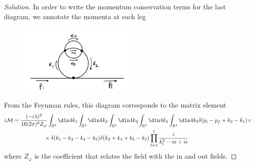 \begin{proof}[Solution]
   In order to write the momentum conservation terms for the last diagram, we annotate the momenta at each leg
   \begin{figure}[H]
      \centering
      \includegraphics[width=0.5\textwidth]{p2b.png}
   \end{figure}
   \noindent From the Feynman rules, this diagram corresponds to the matrix element
   \begin{align*}
      i \mathcal{M} &= \frac{(-i \lambda)^3}{16(2 \pi)^8 Z_\varphi} \int_{\mathbb{R}^4} \dln4{k_1} \int_{\mathbb{R}^4} \dln4{k_2} \int_{\mathbb{R}^4} \dln4{k_3} \int_{\mathbb{R}^4} \dln4{k_4} \int_{\mathbb{R}^4} \dln4{k_5} \delta(p_i - p_f + k_2 - k_1) \times \\
                    &{}\phantom{=\frac{(-i \lambda)^3}{(2 \pi)^8 S Z_\varphi}} \times \delta(k_1 - k_3 - k_4 - k_5) \delta(k_3 + k_4 + k_5 - k_2) \prod_{\ell = 1}^5 \frac{i}{k_i^2 - m + i \epsilon}
   \end{align*}
   where \(Z_\varphi\) is the coefficient that relates the field with the in and out fields.
\end{proof}
